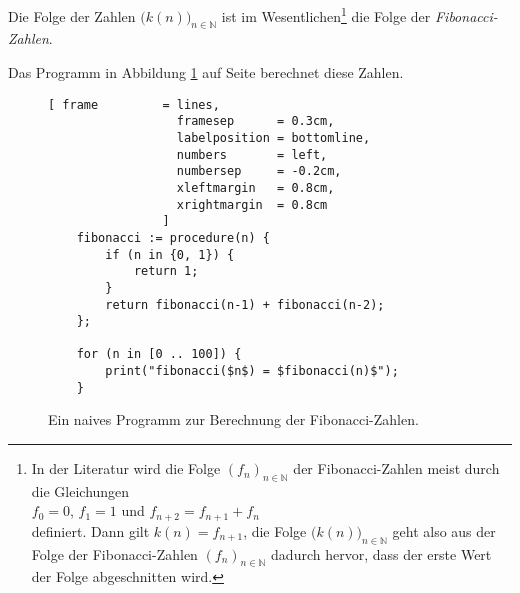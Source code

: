 Die Folge der Zahlen $\bigl(k(n)\bigr)_{n\in\mathbb{N}}$ ist im Wesentlichen\footnote{
    In der Literatur wird die Folge $(f_n)_{n \in \mathbb{N}}$ der Fibonacci-Zahlen meist
    durch die Gleichungen 
    \\[0.1cm]
    \hspace*{1.3cm}
    $f_0 = 0$, \quad $f_1 = 1$ \quad und \quad $f_{n+2} = f_{n+1} + f_n$
    \\[0.1cm]
    definiert. Dann gilt $k(n) = f_{n+1}$, die Folge $\bigl(k(n)\bigr)_{n \in \mathbb{N}}$
    geht also aus der Folge der Fibonacci-Zahlen $(f_n)_{n \in \mathbb{N}}$ dadurch
    hervor, dass der erste Wert der Folge abgeschnitten wird.
}
 die Folge der
\emph{Fibonacci-Zahlen}.   

Das Programm in Abbildung
\ref{fig:fibonacci} auf Seite \pageref{fig:fibonacci} berechnet diese Zahlen.

\begin{figure}[!h]
  \centering
\begin{Verbatim}[ frame         = lines, 
                  framesep      = 0.3cm, 
                  labelposition = bottomline,
                  numbers       = left,
                  numbersep     = -0.2cm,
                  xleftmargin   = 0.8cm,
                  xrightmargin  = 0.8cm
                ]
    fibonacci := procedure(n) {
        if (n in {0, 1}) {
            return 1;
        }
        return fibonacci(n-1) + fibonacci(n-2);
    };
    
    for (n in [0 .. 100]) {
        print("fibonacci($n$) = $fibonacci(n)$");
    }
\end{Verbatim}
\vspace*{-0.3cm}
  \caption{Ein naives Programm zur Berechnung der Fibonacci-Zahlen.}
  \label{fig:fibonacci}
\end{figure} 

